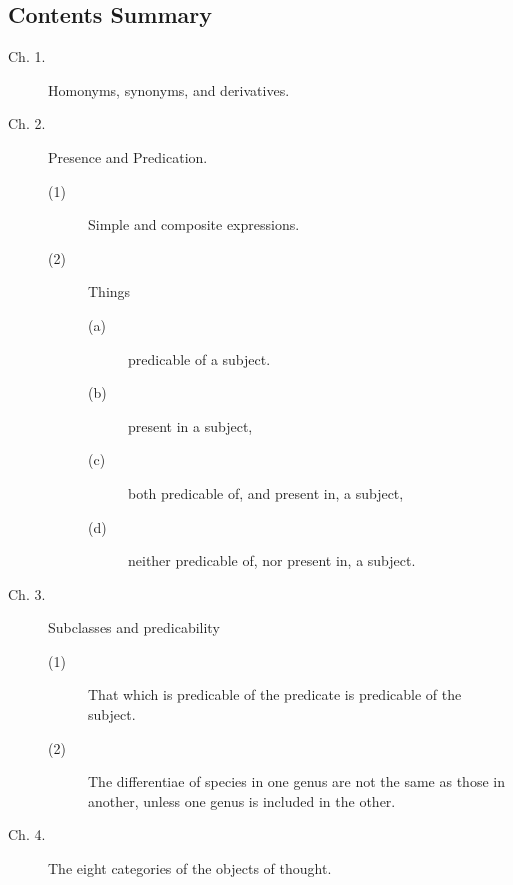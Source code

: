 
\subsection*{Contents Summary} 

\renewcommand{\aref}{\arefB}

\begin{description}
\item[Ch. 1.] Homonyms, synonyms, and derivatives. 

\item[Ch. 2.] Presence and Predication.

\begin{description}
\item[(1)] Simple and composite expressions. 
\item[(2)] Things
\begin{description}
\item[(a)] predicable of a subject.
\item[(b)] present in a subject,
\item[(c)] both predicable of, and present in, a subject,
\item[(d)] neither predicable of, nor present in, a subject.
\end{description}
\end{description}

\item[Ch. 3.] Subclasses and predicability
\begin{description}
\item[(1)] That which is predicable of the predicate is predicable of the subject. 
\item[(2)] The differentiae of species in one genus are not the same as those in another, unless one genus is included in the other. 
\end{description}

\item[Ch. 4.] The eight categories of the objects of thought. 


\end{description}
